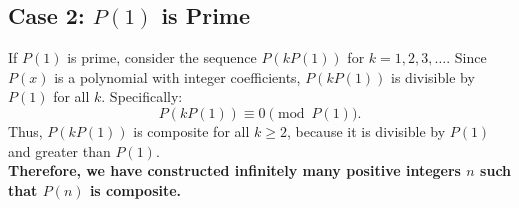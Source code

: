 \documentclass{article}
\begin{document}
\subsection{Case 2: $P(1)$ is Prime}
If $P(1)$ is prime, consider the sequence $P(kP(1))$ for $k = 1, 2, 3, \dots$. Since $P(x)$ is a polynomial with integer coefficients, $P(kP(1))$ is divisible by $P(1)$ for all $k$. Specifically:
\[
P(kP(1)) \equiv 0 \pmod{P(1)}.
\]
Thus, $P(kP(1))$ is composite for all $k \geq 2$, because it is divisible by $P(1)$ and greater than $P(1)$.\\

\textbf{Therefore, we have constructed infinitely many positive integers $n$ such that $P(n)$ is composite.}
\end{document}
